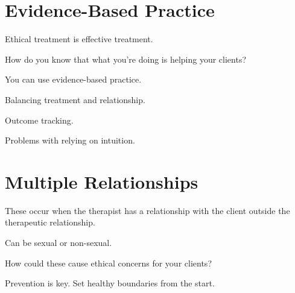 \section{Evidence-Based Practice}

\begin{coloredlist}
    \item Ethical treatment is effective treatment.
    \item How do you know that what you're doing is helping your clients?
    \begin{coloredlist}
        \item You can use evidence-based practice.
        \begin{coloredlist}
            \item Balancing treatment and relationship.
        \end{coloredlist}
        \item Outcome tracking.
        \item Problems with relying on intuition.
    \end{coloredlist}
\end{coloredlist}

\section{Multiple Relationships}

\begin{coloredlist}
    \item These occur when the therapist has a relationship with the client outside the therapeutic relationship.
    \item Can be sexual or non-sexual.
    \item How could these cause ethical concerns for your clients?
    \item Prevention is key. Set healthy boundaries from the start.
\end{coloredlist}